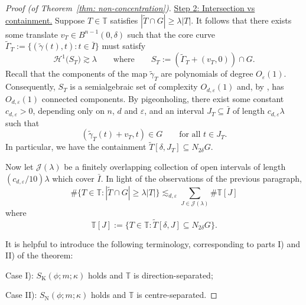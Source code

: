 \documentclass[reqno]{amsart}
\numberwithin{equation}{section}
\newcommand{\T}{\mathbb{T}}
\newcommand{\cH}{\mathcal{H}}
\newcommand{\cJ}{\mathcal{J}}
\theoremstyle{plain}
\theoremstyle{definition}
\newcommand{\tK}{\mathrm{K}}
\newcommand{\tN}{\mathrm{N}}
\begin{document}
\begin{proof}[Proof (of Theorem~\ref{thm: non-concentration})]
\noindent \underline{Step 2: Intersection vs containment.} Suppose $T \in \T$ satisfies $|\widetilde{T} \cap G| \geq \lambda |T|$. It follows that there exists some translate $v_T \in B^{n-1}(0,\delta)$ such that the core curve $\widetilde{\Gamma}_T := \{(\widetilde{\gamma}(t), t) : t \in \bar{I} \}$ must satisfy
\begin{equation*}
    \cH^1\big(S_T\big) \gtrsim \lambda \qquad \textrm{where} \qquad S_T := (\widetilde{\Gamma}_T + (v_T,0)) \cap G. 
\end{equation*}
Recall that the components of the map $\widetilde{\gamma}_T$ are polynomials of degree $O_{\varepsilon}(1)$. Consequently, $S_T$ is a semialgebraic set of complexity $O_{d, \varepsilon}(1)$ and, by \cite[Theorem 1]{BPR1996}, has $O_{d,\varepsilon}(1)$ connected components. By pigeonholing, there exist some constant $c_{d, \varepsilon} > 0$, depending only on $n$, $d$ and $\varepsilon$, and an interval $J_T \subseteq \bar{I}$ of length $c_{d, \varepsilon}\lambda$ such that 
\begin{equation*}
  (\widetilde{\gamma}_T(t) + v_T, t) \in G \qquad \textrm{for all $t \in J_T$.}
\end{equation*}
In particular, we have the containment $\widetilde{T}[\delta, J_T] \subseteq N_{2\delta} G$.

Now let $\cJ(\lambda)$ be a finitely overlapping collection of open intervals of length $(c_{d, \varepsilon}/10) \lambda$ which cover $\bar{I}$. In light of the observations of the previous paragraph, 
\begin{equation}\label{eq: int vs cont 1}
    \#\{T \in \T : |\widetilde{T} \cap G| \geq \lambda |T| \} \lesssim_{d, \varepsilon} \sum_{J \in \cJ(\lambda)} \# \T[J]
\end{equation}
where 
\begin{equation*}
    \T[J] := \big\{T \in \T : \widetilde{T}[\delta, J] \subseteq N_{2\delta} G \big\}.
\end{equation*}

It is helpful to introduce the following terminology, corresponding to parts I) and II) of the theorem:\smallskip

\noindent Case I): $S_{\tK}(\phi;m;\kappa)$ holds and $\T$ is direction-separated;\smallskip

\noindent Case II): $S_{\tN}(\phi;m;\kappa)$ holds and $\T$ is centre-separated.\medskip


\end{proof}
\end{document}
